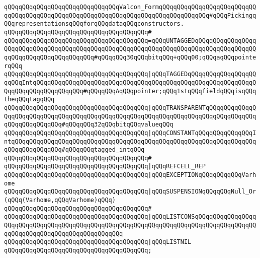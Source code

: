 \newline
\newline
\newline
\verb|qQQqqQQqqQQqqQQqqQQqqQQqqQQqqQQqValcon_FormqQQqqQQqqQQqqQQqqQQqqQQqqQQqqQQqqQQqqQQqqQQqqQQqqQQqqQQqqQQqqQQqqQQqqQQqqQQqqQQqqQQq#qQQqPickingqQQqrepresentationsqQQqforqQQqdataqQQqconstructors.|\newline
\verb|qQQqqQQqqQQqqQQqqQQqqQQqqQQqqQQqqQQqqQQq#|\newline
\verb|qQQqqQQqqQQqqQQqqQQqqQQqqQQqqQQqqQQqqQQq=qQQqUNTAGGEDqQQqqQQqqQQqqQQqqQQqqQQqqQQqqQQqqQQqqQQqqQQqqQQqqQQqqQQqqQQqqQQqqQQqqQQqqQQqqQQqqQQqqQQqqQQqqQQqqQQqqQQqqQQqqQQq#qQQqqQQq30qQQqbitqQQq+qQQq00;qQQqaqQQqpointerqQQq|\newline
\verb|qQQqqQQqqQQqqQQqqQQqqQQqqQQqqQQqqQQqqQQq|\verb#|qQQqTAGGEDqQQqqQQqqQQqqQQqqQQqqQQqIntqQQqqQQqqQQqqQQqqQQqqQQqqQQqqQQqqQQqqQQqqQQqqQQqqQQqqQQqqQQqqQQqqQQqqQQqqQQqqQQqqQQq#\verb|#qQQqqQQqAqQQqpointer;qQQq1stqQQqfieldqQQqisqQQqtheqQQqtagqQQq|\newline
\verb|qQQqqQQqqQQqqQQqqQQqqQQqqQQqqQQqqQQqqQQq|\verb#|qQQqTRANSPARENTqQQqqQQqqQQqqQQqqQQqqQQqqQQqqQQqqQQqqQQqqQQqqQQqqQQqqQQqqQQqqQQqqQQqqQQqqQQqqQQqqQQqqQQqqQQqqQQqqQQq#\verb|#qQQqqQQq32qQQqbitqQQqvalueqQQq|\newline
\verb|qQQqqQQqqQQqqQQqqQQqqQQqqQQqqQQqqQQqqQQq|\verb#|qQQqCONSTANTqQQqqQQqqQQqqQQqIntqQQqqQQqqQQqqQQqqQQqqQQqqQQqqQQqqQQqqQQqqQQqqQQqqQQqqQQqqQQqqQQqqQQqqQQqqQQqqQQqqQQq#\verb|#qQQqqQQqtagged_intqQQq|\newline
\verb|qQQqqQQqqQQqqQQqqQQqqQQqqQQqqQQqqQQqqQQq#|\newline
\verb|qQQqqQQqqQQqqQQqqQQqqQQqqQQqqQQqqQQqqQQq|\verb#|qQQqREFCELL_REP#\newline
\verb|qQQqqQQqqQQqqQQqqQQqqQQqqQQqqQQqqQQqqQQq|\verb#|qQQqEXCEPTIONqQQqqQQqqQQqVarhome#\newline
\verb|qQQqqQQqqQQqqQQqqQQqqQQqqQQqqQQqqQQqqQQq|\verb#|qQQqSUSPENSIONqQQqqQQqNull_Or(qQQq(Varhome,qQQqVarhome)qQQq)#\newline
\verb|qQQqqQQqqQQqqQQqqQQqqQQqqQQqqQQqqQQqqQQq#|\newline
\verb|qQQqqQQqqQQqqQQqqQQqqQQqqQQqqQQqqQQqqQQq|\verb#|qQQqLISTCONSqQQqqQQqqQQqqQQqqQQqqQQqqQQqqQQqqQQqqQQqqQQqqQQqqQQqqQQqqQQqqQQqqQQqqQQqqQQqqQQqqQQqqQQqqQQqqQQqqQQqqQQqqQQqqQQqqQQqqQQq#\newline
\verb|qQQqqQQqqQQqqQQqqQQqqQQqqQQqqQQqqQQqqQQq|\verb#|qQQqLISTNIL#\newline
\verb|qQQqqQQqqQQqqQQqqQQqqQQqqQQqqQQqqQQqqQQq;|\newline
